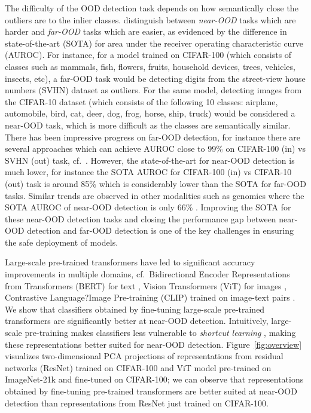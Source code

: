 \documentclass{article}
\begin{document}
The difficulty of the OOD detection task depends on how semantically close the outliers are to the inlier classes.
\citet{winkens2020contrastive} distinguish between \emph{near-OOD} tasks which are harder and  \emph{far-OOD} tasks which are easier, as evidenced by the difference in state-of-the-art (SOTA) for area under the receiver operating characteristic curve (AUROC). For instance, for a model trained on CIFAR-100 (which consists of classes such as mammals, fish, flowers, fruits, household devices, trees, vehicles, insects, etc),  a far-OOD  task would be detecting digits from the street-view house numbers (SVHN) dataset as outliers.  For the same model, detecting images from  the CIFAR-10 dataset (which consists of the following 10 classes: airplane,	automobile,  
bird, cat, 	deer, dog, 	frog, horse, ship, truck) would be considered a near-OOD task, which is more difficult as the classes are semantically similar. 
There has been impressive progress on far-OOD detection, for instance there are several approaches which can achieve AUROC close to 99\%  on CIFAR-100 (in) vs SVHN (out) task, cf.~\citep{sastry2020detecting}. However, the state-of-the-art for near-OOD detection is much lower, for instance the SOTA AUROC for CIFAR-100 (in) vs CIFAR-10 (out) task is around 85\% \citep{zhang2020hybrid} which is considerably lower than the SOTA for far-OOD tasks. Similar trends are observed in other modalities such as genomics where the SOTA AUROC of near-OOD detection is only 66\% \citep{ren2019likelihood}. 
Improving the SOTA for these near-OOD detection tasks and closing the performance gap between near-OOD detection and far-OOD detection is one of the key challenges in ensuring the safe deployment of models.

 

Large-scale pre-trained transformers have led to significant accuracy improvements in multiple domains, cf.~Bidirectional Encoder Representations from Transformers (BERT) for text \citep{devlin2018bert}, Vision Transformers (ViT) for images \citep{dosovitskiy2020image},  Contrastive Language?Image Pre-training (CLIP) trained on image-text pairs \citep{clip}.   
We show that classifiers obtained by fine-tuning large-scale pre-trained transformers are significantly better at near-OOD detection. Intuitively, large-scale pre-training makes classifiers less vulnerable to \emph{shortcut learning}  \citep{geirhos2020shortcut}, making these representations better suited for near-OOD detection. 
Figure~\ref{fig:overview} visualizes two-dimensional PCA projections of representations from residual networks (ResNet) \citep{he2016deep} trained on CIFAR-100 and ViT model pre-trained on ImageNet-21k and fine-tuned on CIFAR-100; we can observe that representations obtained by fine-tuning pre-trained transformers are better suited at near-OOD detection than representations from ResNet just trained on CIFAR-100.  
\end{document}
